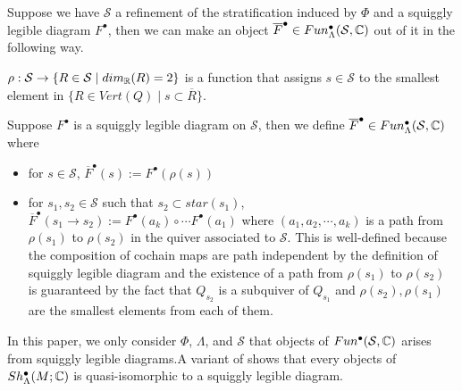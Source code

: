 Suppose we have $\mathcal{S}$ a refinement of the stratification induced by $\Phi$ and a squiggly legible diagram $F^\bullet$, then we can make an object $\overline{F}^\bullet \in Fun^\bullet_\Lambda(\mathcal{S},\mathbb{C})$ out of it in the following way.
\begin{definition}
$\rho : \mathcal{S} \rightarrow \{R\in \mathcal{S} \mid dim_{\mathbb{R}}(R) =2\}$ is a function that assigns $s\in \mathcal{S}$ to the smallest element in $\{R\in Vert(Q) \mid s \subset \overline{R}\}$.
\end{definition}

\begin{definition}
Suppose $F^\bullet$ is a squiggly legible diagram on $\mathcal{S}$, then we define $\overline{F}^\bullet \in Fun^\bullet _\Lambda (\mathcal{S},\mathbb{C})$ where 
\begin{itemize}
\item for $s\in \mathcal{S}$, $\overline{F}^\bullet(s) := F^\bullet(\rho(s))$

\item for $s_1,s_2 \in \mathcal{S}$ such that $s_2 \subset star(s_1)$, $\overline{F}^\bullet (s_1 \rightarrow s_2) := F^\bullet(a_k)\circ \cdots F^\bullet(a_1)$ where $(a_1,a_2,\cdots,a_k)$ is a path from $\rho(s_1)$ to $\rho(s_2)$ in the quiver associated to $\mathcal{S}$. This is well-defined because the composition of cochain maps are path independent by the definition of squiggly legible diagram and the existence of a path from $\rho(s_1)$ to $\rho(s_2)$ is guaranteed by the fact that $Q_{s_2}$ is a subquiver of $Q_{s_1}$ and $\rho(s_2),\rho(s_1)$ are the smallest elements from each of them.
\end{itemize}
\end{definition}
In this paper, we only consider $\Phi$, $\Lambda$, and $\mathcal{S}$ that objects of $Fun^\bullet(\mathcal{S},\mathbb{C})$ arises from squiggly legible diagrams.A variant of \cite[Prop~3.22.]{shende2017legendrian} shows that every objects of $Sh^\bullet_\Lambda(M;\mathbb{C})$ is quasi-isomorphic to a squiggly legible diagram.

